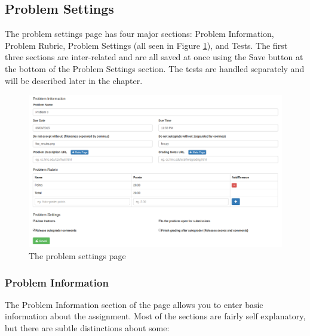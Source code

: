 \documentclass[11pt]{report}
\begin{document}
\subsection{Problem Settings}
The problem settings page has four major sections: Problem Information, Problem Rubric, Problem Settings
(all seen in Figure \ref{fig:problem_settings}), and Tests. The first three sections are inter-related and
are all saved at once using the Save button at the bottom of the Problem Settings section. The tests are 
handled separately and will be described later in the chapter. 

\begin{figure}
\centering
\includegraphics[width=\textwidth,height=\textheight,keepaspectratio]{diagrams/problem_settings}
\caption{The problem settings page}
\label{fig:problem_settings}
\end{figure}

\subsubsection{Problem Information}
The Problem Information section of the page allows you to enter basic information about the assignment.
Most of the sections are fairly self explanatory, but there are subtle distinctions about some:
\end{document}

